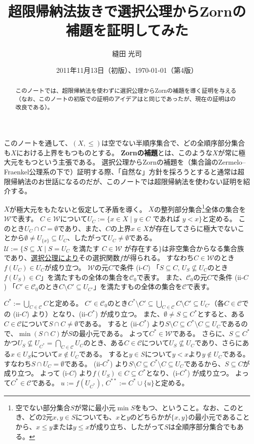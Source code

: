 ﻿\documentclass{ltjsarticle}
\title{超限帰納法抜きで選択公理からZornの補題を証明してみた}
\author{縫田 光司}
\date{2011年11月13日（初版）、\today （第4版）}
\theoremstyle{definition}
\begin{document}
\maketitle

\begin{abstract}
このノートでは、超限帰納法を使わずに選択公理からZornの補題を導く証明を与える（なお、このノートの初版での証明のアイデアは\cite[Theorem 4.19]{RubRub85}と同じであったが、現在の証明は\cite{Lewin91}の改良である）。
\end{abstract}

このノートを通して、$(X,\leq)$は空でない半順序集合で、どの全順序部分集合も$X$における上界をもつものとする。
\textbf{Zornの補題}とは、このような$X$が常に極大元をもつという主張である。
選択公理からZornの補題を（集合論のZermelo--Fraenkel公理系の下で）証明する際、「自然な」方針を採ろうとすると通常は超限帰納法のお世話になるのだが、このノートでは超限帰納法を使わない証明を紹介する。

$X$が極大元をもたないと仮定して矛盾を導く。
$X$の整列部分集合\footnote{空でない部分集合$S$が常に最小元$\min S$をもつ、ということ。なお、このとき、どの$2$元$x,y \in S$についても、$x$と$y$のどちらかが$\{x,y\}$の最小元であることから、$x \leq y$または$y \leq x$が成り立ち、したがって$S$は全順序部分集合でもある。}全体の集合を$\mathcal{W}$で表す。
$C \in \mathcal{W}$について$U_C := \{ x \in X \mid y \in C \mbox{ であれば } y < x \}$と定める。
このとき$U_C \cap C = \emptyset$であり、また、$C$の上界$x \in X$が存在してさらに極大でないことから$\emptyset \neq U_{\{x\}} \subseteq U_C$、したがって$U_C \neq \emptyset$である。
$\mathcal{U} := \{ S \subseteq X \mid S = U_C \mbox{ を満たす } C \in \mathcal{W} \mbox{ が存在する} \}$は非空集合からなる集合族であり、\underline{選択公理により}その選択関数$f$が得られる。
すなわち$C \in \mathcal{W}$のとき$f(U_C) \in U_C$が成り立つ。
$\mathcal{W}$の元$C$で条件 (i-$C$) 「$S \subseteq C$, $U_S \not\subseteq U_C$のとき$f(U_S) \in C$」を満たすもの全体の集合を$\mathcal{C}_0$で表す。
また、$\mathcal{C}_0$の元$C$で条件 (ii-$C$) 「$C' \in \mathcal{C}_0$のとき$C \setminus C' \subseteq U_{C'}$」を満たすもの全体の集合を$\mathcal{C}$で表す。

$C^* := \bigcup_{C \in \mathcal{C}} C$と定める。
$C' \in \mathcal{C}_0$のとき$C^* \setminus C' \subseteq \bigcup_{C \in \mathcal{C}} C \setminus C' \subseteq U_{C'}$（各$C \in \mathcal{C}$での (ii-$C$) より）となり、(ii-$C^*$) が成り立つ。
また、$\emptyset \neq S \subseteq C^*$とすると、ある$C \in \mathcal{C}$について$S \cap C \neq \emptyset$である。
すると (ii-$C^*$) より$S \setminus C \subseteq C^* \setminus C \subseteq U_C$であるので、$\min(S \cap C)$が$S$の最小元である。
よって$C^* \in \mathcal{W}$である。
さらに、$S \subseteq C^*$かつ$U_S \not\subseteq U_{C^*} = \bigcap_{C \in \mathcal{C}} U_C$のとき、ある$C \in \mathcal{C}$について$U_S \not\subseteq U_C$であり、さらにある$x \in U_S$について$x \not\in U_C$である。
すると$y \in S$について$y < x$より$y \not\in U_C$である。
すなわち$S \cap U_C = \emptyset$である。
(ii-$C^*$) より$S \setminus C \subseteq C^* \setminus C \subseteq U_C$であるから、$S \subseteq C$が成り立つ。
よって (i-$C$) より$f(U_S) \in C \subseteq C^*$となり、(i-$C^*$) が成り立つ。
よって$C^* \in \mathcal{C}$である。
$u := f(U_{C^*})$, $C^{**} := C^* \cup \{u\}$と定める。
\end{document}
